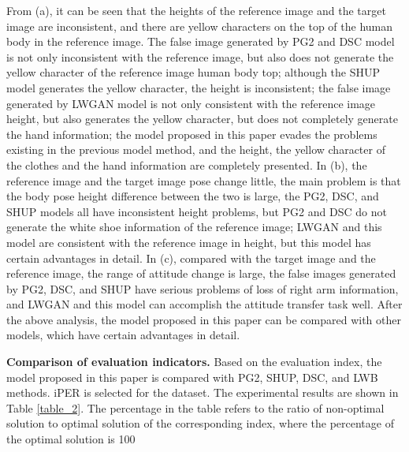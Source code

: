 From (a), it can be seen that the heights of the reference image and the target image are inconsistent, and there are yellow characters on the top of the human body in the reference image. The false image generated by PG2 and DSC model is not only inconsistent with the reference image, but also does not generate the yellow character of the reference image human body top; although the SHUP model generates the yellow character, the height is inconsistent; the false image generated by LWGAN model is not only consistent with the reference image height, but also generates the yellow character, but does not completely generate the hand information; the model proposed in this paper evades the problems existing in the previous model method, and the height, the yellow character of the clothes and the hand information are completely presented. In (b), the reference image and the target image pose change little, the main problem is that the body pose height difference between the two is large, the PG2, DSC, and SHUP models all have inconsistent height problems, but PG2 and DSC do not generate the white shoe information of the reference image; LWGAN and this model are consistent with the reference image in height, but this model has certain advantages in detail. In (c), compared with the target image and the reference image, the range of attitude change is large, the false images generated by PG2, DSC, and SHUP have serious problems of loss of right arm information, and LWGAN and this model can accomplish the attitude transfer task well. After the above analysis, the model proposed in this paper can be compared with other models, which have certain advantages in detail.
	
\textbf{Comparison of evaluation indicators.} Based on the evaluation index, the model proposed in this paper is compared with PG2, SHUP, DSC, and LWB methods. iPER is selected for the dataset. The experimental results are shown in Table \ref{table_2}. The percentage in the table refers to the ratio of non-optimal solution to optimal solution of the corresponding index, where the percentage of the optimal solution is 100%

